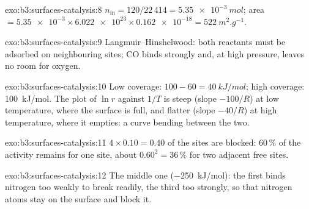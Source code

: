 \begin{solution}{exo:b3:surfaces-catalysis:8}
$n_{\mathrm m} = 120/22\,414 = \qty{5.35e-3}{mol}$; area $= \num{5.35e-3} \times \num{6.022e23} \times \num{0.162e-18} =
\qty{522}{m^2.g^{-1}}$.
\end{solution}

\begin{solution}{exo:b3:surfaces-catalysis:9}
Langmuir--Hinshelwood: both reactants must be adsorbed on neighbouring sites;
CO binds strongly and, at high pressure, leaves no room for oxygen.
\end{solution}

\begin{solution}{exo:b3:surfaces-catalysis:10}
Low coverage: $100 - 60 = \qty{40}{kJ/mol}$; high coverage: \qty{100}{kJ/mol}. The plot of $\ln r$
against $1/T$ is steep (slope $-100/R$) at low temperature, where the surface is
full, and flatter (slope $-40/R$) at high temperature, where it empties: a curve
bending between the two.
\end{solution}

\begin{solution}{exo:b3:surfaces-catalysis:11}
$4 \times 0.10 = 0.40$ of the sites are blocked: 60\,\% of the activity remains for one
site, about $0.60^2 = 36\,\%$ for two adjacent free sites.
\end{solution}

\begin{solution}{exo:b3:surfaces-catalysis:12}
The middle one (\qty{-250}{kJ/mol}): the first binds nitrogen too weakly to break 
readily, the third too strongly, so that nitrogen atoms stay on the surface
and block it.
\end{solution}

